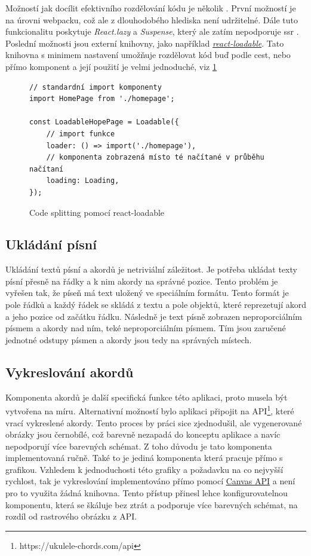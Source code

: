 Možností jak docílit efektivního rozdělování kódu je několik \cite{facebookinc_2018_codesplitting}. První možností je na úrovni webpacku, což ale z dlouhodobého hlediska není udržitelné. Dále tuto funkcionalitu poskytuje \emph{React.lazy} a \emph{Suspense}, který ale zatím nepodporuje \acrshort{ssr} \cite{facebookinc_2018_codesplitting}. Poslední možnosti jsou externí knihovny, jako například \href{https://github.com/jamiebuilds/react-loadable}{\emph{react-loadable}}. Tato knihovna s minimem nastavení umožňuje rozdělovat kód buď podle cest, nebo přímo komponent a její použití je velmi jednoduché, viz \ref{code:code_splitting}

\begin{figure}[h!]
    \centering
    \begin{verbatim}
// standardní import komponenty
import HomePage from './homepage';

const LoadableHopePage = Loadable({
    // import funkce
    loader: () => import('./homepage'),
    // komponenta zobrazená místo té načítané v průběhu načítaní
    loading: Loading,
});
    \end{verbatim}
    \caption{Code splitting pomocí react-loadable}
    \label{code:code_splitting}
\end{figure}

\subsection{Ukládání písní}
\label{ss:song_saving}
Ukládání textů písní a akordů je netriviální záležitost. Je potřeba ukládat texty písní přesně na řádky a k nim akordy na správné pozice. Tento problém je vyřešen tak, že píseň má text uložený ve speciálním formátu. Tento formát je pole řádků a každý řádek se skládá z textu a pole objektů, které reprezetují akord a jeho pozice od začátku řádku. Následně je text písně zobrazen neproporciálním písmem a akordy nad ním, teké neproporciálním písmem. Tím jsou zaručené jednotné odstupy písmen a akordy jsou tedy na správných místech.

\subsection{Vykreslování akordů}
\label{ss:chords_render}
Komponenta akordů je další specifická funkce této aplikaci, proto musela být vytvořena na míru. Alternativní možností bylo aplikaci připojit na API\footnote{https://ukulele-chords.com/api}, které vrací vykreslené akordy. Tento proces by práci sice zjednodušil, ale vygenerované obrázky jsou černobílé, což barevně nezapadá do konceptu aplikace a navíc nepodporují více barevných schémat. Z toho důvodu je tato komponenta implementovaná ručně. Také to je jediná komponenta která pracuje přímo s grafikou. Vzhledem k jednoduchosti této grafiky a požadavku na co nejvyšší rychlost, tak je vykreslování implementováno přímo pomocí \href{https://developer.mozilla.org/en-US/docs/Web/API/Canvas_API}{Canvas API} a není pro to využita žádná knihovna. Tento přístup přinesl lehce konfigurovatelnou komponentu, která se škáluje bez ztrát a podporuje více barevných schémat, na rozdíl od rastrového obrázku z API.

